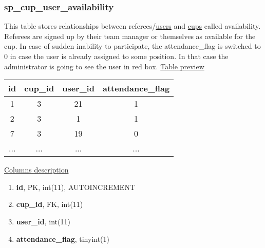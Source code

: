\subsubsection*{sp\_cup\_user\_availability}
This table stores relationships between referees/\underline{users} and \underline{cups} called availability. Referees are signed up by their team manager or themselves as available for the cup. In case of sudden inability to participate, the attendance\_flag is switched to 0 in case the user is already assigned to some position. In that case the administrator is going to see the user in red box.
\newline
\underline{Table preview}
\begin{center}
 \begin{tabular}{||c c c c||} 
 \hline
 id & cup\_id & user\_id & attendance\_flag  \\ [0.5ex] 
 \hline\hline
 1 & 3 & 21 & 1 \\ 
 \hline
 2 & 3 & 1 & 1 \\ 
 \hline
 7 & 3 & 19 & 0 \\ 
 \hline
 ... & ... & ... & ...  \\ [1ex] 
 \hline
\end{tabular}
\end{center}
\underline{Columns description}
\begin{enumerate}
  \setlength\itemsep{0em}
  \item \textbf{id}, PK, int(11), AUTOINCREMENT
  \item \textbf{cup\_id}, FK, int(11)
  \item \textbf{user\_id}, int(11)
  \item \textbf{attendance\_flag}, tinyint(1)
\end{enumerate}

